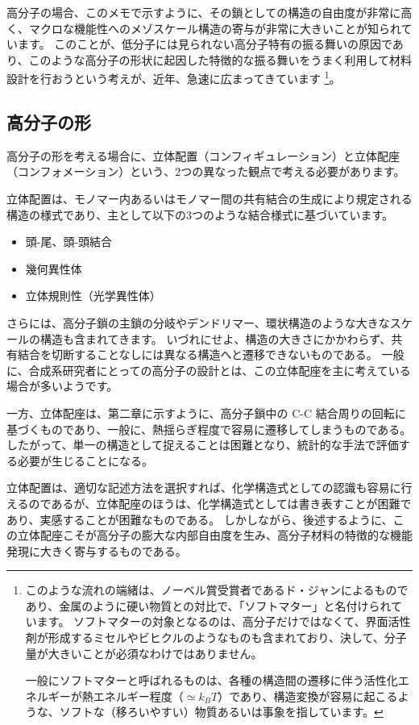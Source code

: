 \documentclass[a4paper,11pt]{ltjsarticle}
\begin{document}
高分子の場合、このメモで示すように、その鎖としての構造の自由度が非常に高く、マクロな機能性へのメゾスケール構造の寄与が非常に大きいことが知られています。
このことが、低分子には見られない高分子特有の振る舞いの原因であり、このような高分子の形状に起因した特徴的な振る舞いをうまく利用して材料設計を行おうという考えが、近年、急速に広まってきています
\footnote
{
このような流れの端緒は、ノーベル賞受賞者であるド・ジャンによるものであり、金属のように硬い物質との対比で、「ソフトマター」と名付けられています。
ソフトマターの対象となるのは、高分子だけではなくて、界面活性剤が形成するミセルやビヒクルのようなものも含まれており、決して、分子量が大きいことが必須なわけではありません。

一般にソフトマターと呼ばれるものは、各種の構造間の遷移に伴う活性化エネルギーが熱エネルギー程度（$\simeq k_B T$）であり、構造変換が容易に起こるような、ソフトな（移ろいやすい）物質あるいは事象を指しています。
}。
\subsection{高分子の形}

高分子の形を考える場合に、立体配置（コンフィギュレーション）と立体配座（コンフォメーション）という、2つの異なった観点で考える必要があります。

立体配置は、モノマー内あるいはモノマー間の共有結合の生成により規定される構造の様式であり、主として以下の3つのような結合様式に基づいています。
\begin{itemize}
\item 
頭-尾、頭-頭結合
\item
幾何異性体
\item
立体規則性（光学異性体）
\end{itemize}
さらには、高分子鎖の主鎖の分岐やデンドリマー、環状構造のような大きなスケールの構造も含まれてきます。
いづれにせよ、構造の大きさにかかわらず、共有結合を切断することなしには異なる構造へと遷移できないものである。
一般に、合成系研究者にとっての高分子の設計とは、この立体配座を主に考えている場合が多いようです。

一方、立体配座は、第二章に示すように、高分子鎖中の C-C 結合周りの回転に基づくものであり、一般に、熱揺らぎ程度で容易に遷移してしまうものである。
したがって、単一の構造として捉えることは困難となり、統計的な手法で評価する必要が生じることになる。

立体配置は、適切な記述方法を選択すれば、化学構造式としての認識も容易に行えるのであるが、立体配座のほうは、化学構造式としては書き表すことが困難であり、実感することが困難なものである。
しかしながら、後述するように、この立体配座こそが高分子の膨大な内部自由度を生み、高分子材料の特徴的な機能発現に大きく寄与するものである。
\end{document}
